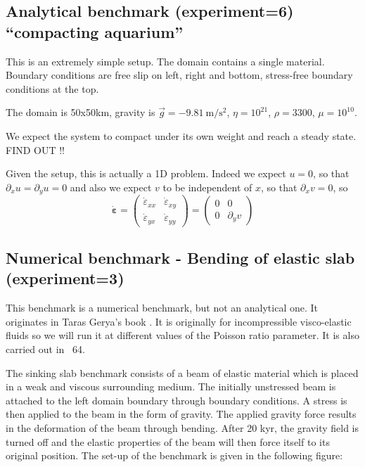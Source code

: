 \newpage
\subsection*{Analytical benchmark (experiment=6) ``compacting aquarium''}

This is an extremely simple setup. The domain contains a single material. 
Boundary conditions are free slip on left, right and bottom, stress-free boundary conditions 
at the top. 

The domain is 50x50km, gravity is $\vec{g}=-9.81~\si{\meter\per\square\second}$, 
$\eta=10^{21}$, $\rho=3300$, $\mu=10^{10}$.

We expect the system to compact under its own weight and reach a 
steady state. FIND OUT !!

Given the setup, this is actually a 1D problem. Indeed we expect $u=0$, so that
$\partial_x u = \partial_y u =0$ and also we expect $v$ to be independent of $x$, 
so that $\partial_x v=0$, so
\[
\dot{\bm\varepsilon}
=\left( 
\begin{array}{cc}
\dot\varepsilon_{xx} & \dot\varepsilon_{xy} \\
\dot\varepsilon_{yx} & \dot\varepsilon_{yy} 
\end{array}
\right)
=
\left( 
\begin{array}{cc}
0 & 0 \\
0 & \partial_y v
\end{array}
\right)
\]




\newpage
\subsection*{Numerical benchmark - Bending of elastic slab (experiment=3)}

This benchmark is a numerical benchmark, but not an analytical one. 
It originates in Taras Gerya's book \cite{gery19book}. It is originally for incompressible 
visco-elastic fluids so we will run it at different values of the Poisson ratio parameter.
It is also carried out in \stone~64.

The sinking slab benchmark consists of a beam of elastic material which is placed 
in a weak and viscous surrounding medium. The initially unstressed beam is attached 
to the left domain boundary through boundary conditions. A stress is then applied to  
the beam in the form of gravity. The applied gravity force results in the deformation 
of the beam through bending. After 20 kyr, the gravity field is turned off and the 
elastic properties of the beam will then force itself to its original position.  
The set-up of the benchmark is given in the following figure: 

